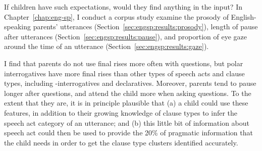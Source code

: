 If children have such expectations, would they find anything in the input? In Chapter~\ref{chap:eng-sp}, 
I conduct a corpus study examine the prosody of English-speaking parents' utterances (Section~\ref{sec:engsp:results:prosody}), length of pause after utterances (Section~\ref{sec:engsp:results:pause}), and proportion of eye gaze around the time of an utterance (Section~\ref{sec:engsp:results:gaze}). 


I find that parents do not use final rises more often with questions, but polar interrogatives have more final rises than other types of speech acts and clause types, including \twh-interrogatives and declaratives. Moreover, parents tend to pause longer after questions, and attend the child more when asking questions. To the extent that they are, it is in principle plausible that (a) a child could use these features, in addition to their growing knowledge of clause types to infer the speech act category of an utterance; and (b) this little bit of information about speech act could then be used to provide the 20\% of pragmatic information that the child needs in order to get the clause type clusters identified accurately.

 
